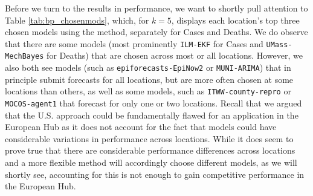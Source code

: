 Before we turn to the results in performance, we want to shortly pull attention to Table \ref{tab:bp_chosenmods}, which, for $k = 5$, displays each location's top three chosen models using the method, separately for Cases and Deaths. We do observe that there are some models (most prominently \texttt{ILM-EKF} for Cases and \texttt{UMass-MechBayes} for Deaths) that are chosen across most or all locations. However, we also both see models (such as \texttt{epiforecasts-EpiNow2} or \texttt{MUNI-ARIMA}) that in principle submit forecasts for all locations, but are more often chosen at some locations than others, as well as some models, such as \texttt{ITWW-county-repro} or \texttt{MOCOS-agent1} that forecast for only one or two locations. Recall that we argued that the U.S. approach could be fundamentally flawed for an application in the European Hub as it does not account for the fact that models could have considerable variations in performance across locations. While it does seem to prove true that there are considerable performance differences across locations and a more flexible method will accordingly choose different models, as we will shortly see, accounting for this is not enough to gain competitive performance in the European Hub.\medskip\\
